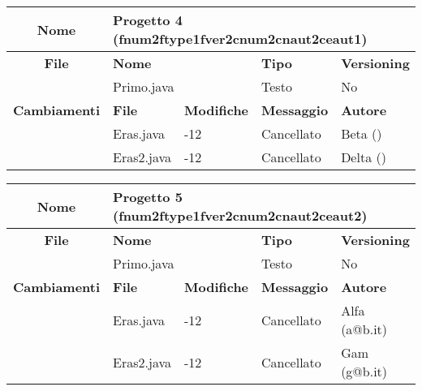 \begin{table}[ht]
\footnotesize
\begin{tabular}{|c|p{2.5cm}|p{2cm}|p{2.5cm}|p{2.5cm}|}
  \hline
  \textbf{Nome}	& \multicolumn{4}{l|}{Progetto 4 (fnum2ftype1fver2cnum2cnaut2ceaut1)} 									\\
  \hline
  \rowcolor{lightgray}\textbf{File} 		& \multicolumn{2}{l|}{\textbf{Nome}}		& \textbf{Tipo}		& \textbf{Versioning} 		\\
						\cline{2-5}
						& \multicolumn{2}{l|}{Primo.java}		& Testo			& No				\\
  \hline
  \rowcolor{lightgray}\textbf{Cambiamenti}	& \textbf{File}		&\textbf{Modifiche}	& \textbf{Messaggio}	& \textbf{Autore}		\\
						\cline{2-5}
						& Eras.java		& -12	  		& Cancellato		& Beta ()			\\
						\cline{2-5}
						& Eras2.java		& -12	  		& Cancellato		& Delta ()			\\
  \hline
\end{tabular}
\end{table}

\begin{table}[ht]
\footnotesize
\begin{tabular}{|c|p{2.5cm}|p{2cm}|p{2.5cm}|p{2.5cm}|}
  \hline
  \textbf{Nome}	& \multicolumn{4}{l|}{Progetto 5 (fnum2ftype1fver2cnum2cnaut2ceaut2)} 									\\
  \hline
  \rowcolor{lightgray}\textbf{File} 		& \multicolumn{2}{l|}{\textbf{Nome}}		& \textbf{Tipo}		& \textbf{Versioning} 		\\
						\cline{2-5}
						& \multicolumn{2}{l|}{Primo.java}		& Testo			& No				\\
  \hline
  \rowcolor{lightgray}\textbf{Cambiamenti}	& \textbf{File}		&\textbf{Modifiche}	& \textbf{Messaggio}	& \textbf{Autore}		\\
						\cline{2-5}
						& Eras.java		& -12	  		& Cancellato		& Alfa (a@b.it)			\\
						\cline{2-5}
						& Eras2.java		& -12	  		& Cancellato		& Gam (g@b.it)			\\
  \hline
\end{tabular}
\end{table}



